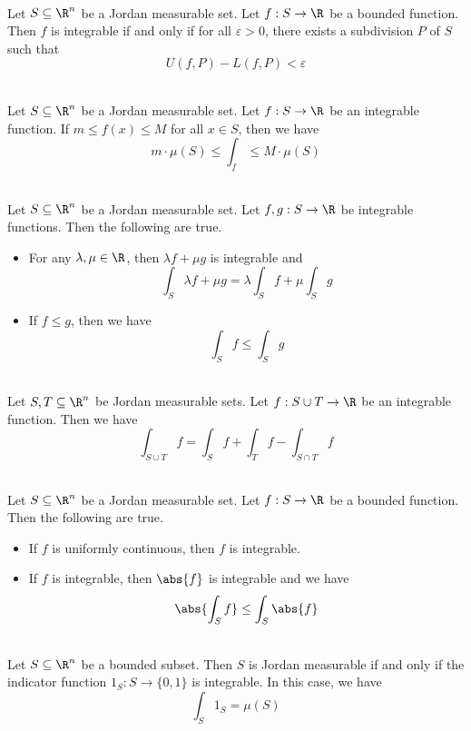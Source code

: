 \documentclass[a4paper]{article}
\begin{document}
\begin{prp}{}{}\\
Let $S\subseteq\R^n$ be a Jordan measurable set. Let $f:S\to\R$ be a bounded function. Then $f$ is integrable if and only if for all $\varepsilon>0$, there exists a subdivision $P$ of $S$ such that $$U(f,P)-L(f,P)<\varepsilon$$
\end{prp}

\begin{lmm}{}{}\\
Let $S\subseteq\R^n$ be a Jordan measurable set. Let $f:S\to\R$ be an integrable function. If $m\leq f(x)\leq M$ for all $x\in S$, then we have $$m\cdot\mu(S)\leq\int_f\leq M\cdot\mu(S)$$
\end{lmm}

\begin{lmm}{}{}\\
Let $S\subseteq\R^n$ be a Jordan measurable set. Let $f,g:S\to\R$ be integrable functions. Then the following are true. 
\begin{itemize}
\item For any $\lambda,\mu\in\R$, then $\lambda f+\mu g$ is integrable and $$\int_S\lambda f+\mu g=\lambda\int_Sf+\mu\int_Sg$$
\item If $f\leq g$, then we have $$\int_Sf\leq\int_Sg$$
\end{itemize}
\end{lmm}

\begin{prp}{}{}\\
Let $S,T\subseteq\R^n$ be Jordan measurable sets. Let $f:S\cup T\to\R$ be an integrable function. Then we have $$\int_{S\cup T}f=\int_Sf+\int_Tf-\int_{S\cap T}f$$
\end{prp}

\begin{prp}{}{}\\
Let $S\subseteq\R^n$ be a Jordan measurable set. Let $f:S\to\R$ be a bounded function. Then the following are true. 
\begin{itemize}
\item If $f$ is uniformly continuous, then $f$ is integrable. 
\item If $f$ is integrable, then $\abs{f}$ is integrable and we have $$\abs{\int_Sf}\leq\int_S\abs{f}$$
\end{itemize}
\end{prp}

\begin{prp}{}{}\\
Let $S\subseteq\R^n$ be a bounded subset. Then $S$ is Jordan measurable if and only if the indicator function $1_S:S\to\{0,1\}$ is integrable. In this case, we have $$\int_S1_S=\mu(S)$$
\end{prp}
\end{document}
